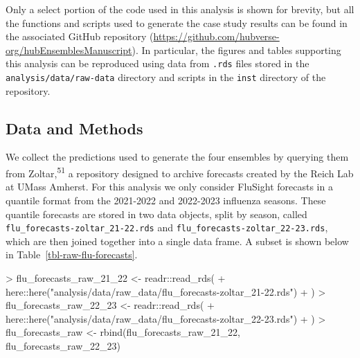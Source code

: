 \documentclass[
]{article}
\newenvironment{Shaded}{\begin{snugshade}}{\end{snugshade}}
\newcommand{\FunctionTok}[1]{\textcolor[rgb]{0.28,0.35,0.67}{#1}}
\newcommand{\NormalTok}[1]{\textcolor[rgb]{0.00,0.23,0.31}{#1}}
\newcommand{\OtherTok}[1]{\textcolor[rgb]{0.00,0.23,0.31}{#1}}
\newcommand{\SpecialCharTok}[1]{\textcolor[rgb]{0.37,0.37,0.37}{#1}}
\newcommand{\StringTok}[1]{\textcolor[rgb]{0.13,0.47,0.30}{#1}}
\begin{document}
Only a select portion of the code used in this analysis is shown for
brevity, but all the functions and scripts used to generate the case
study results can be found in the associated GitHub repository
(\url{https://github.com/hubverse-org/hubEnsemblesManuscript}). In
particular, the figures and tables supporting this analysis can be
reproduced using data from \texttt{.rds} files stored in the
\texttt{analysis/data/raw-data} directory and scripts in the
\texttt{inst} directory of the repository.

\subsection{Data and Methods}\label{data-and-methods}

We collect the predictions used to generate the four ensembles by
querying them from Zoltar,\textsuperscript{51} a repository designed to
archive forecasts created by the Reich Lab at UMass Amherst. For this
analysis we only consider FluSight forecasts in a quantile format from
the 2021-2022 and 2022-2023 influenza seasons. These quantile forecasts
are stored in two data objects, split by season, called
\texttt{flu\_forecasts-zoltar\_21-22.rds} and
\texttt{flu\_forecasts-zoltar\_22-23.rds}, which are then joined
together into a single data frame. A subset is shown below in
Table~\ref{tbl-raw-flu-forecasts}.

\begin{Shaded}
\begin{Highlighting}[]
\SpecialCharTok{\textgreater{}}\NormalTok{ flu\_forecasts\_raw\_21\_22 }\OtherTok{\textless{}{-}}\NormalTok{ readr}\SpecialCharTok{::}\FunctionTok{read\_rds}\NormalTok{(}
\SpecialCharTok{+}\NormalTok{   here}\SpecialCharTok{::}\FunctionTok{here}\NormalTok{(}\StringTok{"analysis/data/raw\_data/flu\_forecasts{-}zoltar\_21{-}22.rds"}\NormalTok{)}
\SpecialCharTok{+}\NormalTok{ )}
\SpecialCharTok{\textgreater{}}\NormalTok{ flu\_forecasts\_raw\_22\_23 }\OtherTok{\textless{}{-}}\NormalTok{ readr}\SpecialCharTok{::}\FunctionTok{read\_rds}\NormalTok{(}
\SpecialCharTok{+}\NormalTok{   here}\SpecialCharTok{::}\FunctionTok{here}\NormalTok{(}\StringTok{"analysis/data/raw\_data/flu\_forecasts{-}zoltar\_22{-}23.rds"}\NormalTok{)}
\SpecialCharTok{+}\NormalTok{ )}
\SpecialCharTok{\textgreater{}}\NormalTok{ flu\_forecasts\_raw }\OtherTok{\textless{}{-}} \FunctionTok{rbind}\NormalTok{(flu\_forecasts\_raw\_21\_22, flu\_forecasts\_raw\_22\_23)}
\end{Highlighting}
\end{Shaded}
\end{document}
